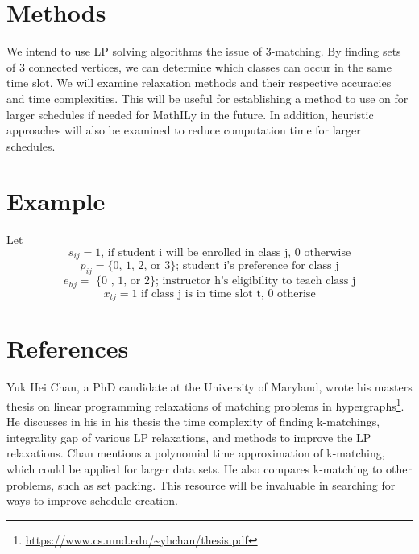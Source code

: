 \documentclass[11pt]{article}
\begin{document}
\section{Methods}

We intend to use LP solving algorithms the issue of 3-matching. By finding sets of 3 connected vertices, we can determine which classes can occur in the same time slot. We will examine relaxation methods and their respective accuracies and time complexities. This will be useful for establishing a method to use on for larger schedules if needed for MathILy in the future. In addition, heuristic approaches will also be examined to reduce computation time for larger schedules.

\section{Example}

Let \[s_{ij} = 1 \text{, if student i will be enrolled in class j, }0 \text{ otherwise}\]
\[p_{ij} = \text{\{0, 1, 2, or 3\}; student i's preference for class j}\]
\[e_{hj} =  \text{ \{0 , 1, or 2\}; instructor h's eligibility to teach class j}\]
\[x_{tj} = 1 \text{ if class j is in time slot t, } 0 \text{ otherise}\]

\section{References}
Yuk Hei Chan, a PhD candidate at the University of Maryland, wrote his masters thesis on linear programming relaxations of matching problems in hypergraphs\footnote{\url{https://www.cs.umd.edu/~yhchan/thesis.pdf}}. He discusses in his in his thesis the time complexity of finding k-matchings, integrality gap of various LP relaxations, and methods to improve the LP relaxations. Chan mentions a polynomial time approximation of k-matching, which could be applied for larger data sets. He also compares k-matching to other problems, such as set packing. This resource will be invaluable in searching for ways to improve schedule creation.
\end{document}
